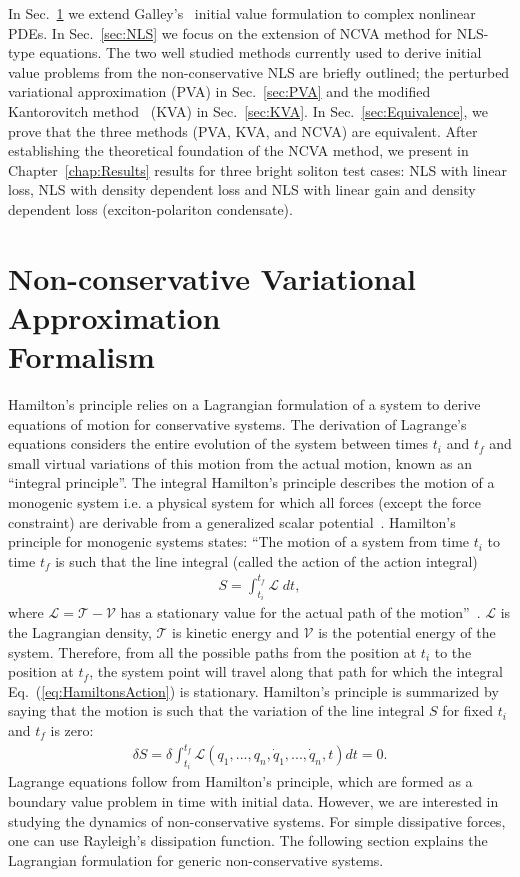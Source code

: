 In Sec.~\ref{sec:NCVA} we extend Galley's~\cite{Galley} initial value formulation to complex nonlinear PDEs.  In Sec.~\ref{sec:NLS} we focus on the extension of NCVA method for NLS-type equations.  The two well studied methods currently used to derive initial value problems from the non-conservative NLS are briefly outlined; the perturbed variational approximation (PVA) in Sec.~\ref{sec:PVA} and the modified Kantorovitch method~\cite{Cerda} (KVA) in Sec.~\ref{sec:KVA}.  In Sec.~\ref{sec:Equivalence}, we prove that the three methods (PVA, KVA, and NCVA) are equivalent.  After establishing the theoretical foundation of the NCVA method, we present in Chapter~\ref{chap:Results} results for three bright soliton test cases:  NLS with linear loss, NLS with density dependent loss and NLS with linear gain and density dependent loss (exciton-polariton condensate).  

\section{Non-conservative Variational Approximation \\ Formalism} \label{sec:NCVA}
Hamilton's principle relies on a Lagrangian formulation of a system to derive equations of motion for conservative systems.  The derivation of Lagrange's equations considers the entire evolution of the system between times $t_i$ and $t_f$ and small virtual variations of this motion from the actual motion, known as an ``integral principle''.  The integral Hamilton's principle describes the motion of a monogenic system i.e. a physical system for which all forces (except the force constraint) are derivable from a generalized scalar potential~\cite{Goldstein}.  Hamilton's principle for monogenic systems states: ``The motion of a system from time $t_i$ to time $t_f$ is such that the line integral (called the action of the action integral) 
\begin{align}
S = \int_{t_i}^{t_f} \mathcal{L} \; dt,
\label{eq:HamiltonsAction}
\end{align}  
where $\mathcal{L} = \mathcal{T}-\mathcal{V}$ has a stationary value for the actual path of the motion''~\cite{Goldstein}.   $\mathcal{L}$ is the Lagrangian density, $\mathcal{T}$ is kinetic energy and $\mathcal{V}$ is the potential energy of the system.  Therefore, from all the possible paths from the position at $t_i$ to the position at $t_f$, the system point will travel along that path for which the integral Eq.~(\ref{eq:HamiltonsAction}) is stationary.  Hamilton's principle is summarized by saying that the motion is such that the variation of the line integral $S$ for fixed $t_i$ and $t_f$ is zero:
\begin{align}
\delta S = \delta \int_{t_i}^{t_f} \mathcal{L}(q_1, ...,q_n, \dot{q}_1,...,\dot{q}_n, t) dt = 0.  
\end{align} 
Lagrange equations follow from Hamilton's principle, which are formed as a boundary value problem in time with initial data.  However, we are interested in studying the dynamics of non-conservative systems.  For simple dissipative forces, one can use Rayleigh's dissipation function.  The following section explains the Lagrangian formulation for generic non-conservative systems. 

